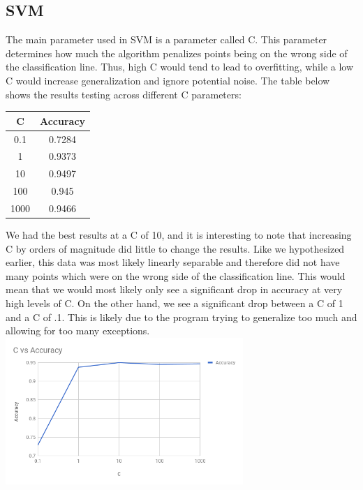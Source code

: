 \documentclass{article}
\begin{document}
        \subsection{SVM}
        The main parameter used in SVM is a parameter called C. This parameter determines how much 
        the algorithm penalizes points being on the wrong side of the classification line. Thus, 
        high C would tend to lead to overfitting, while a low C would increase generalization and 
        ignore potential noise. The table below shows the results testing across different C 
        parameters:
        \begin{center}
            \begin{tabular}{|c|c|}
                \hline
                C       & Accuracy\\
                \hline
                0.1     & 0.7284\\
                1       & 0.9373\\
                10      & 0.9497\\
                100     & 0.945\\
                1000    & 0.9466\\
                \hline
            \end{tabular}
        \end{center}
        We had the best results at a C of 10, and it is interesting to note that increasing C by 
        orders of magnitude did little to change the results. Like we hypothesized earlier, this 
        data was most likely linearly separable and therefore did not have many points which were 
        on the wrong side of the classification line. This would mean that we would most likely 
        only see a significant drop in accuracy at very high levels of C. On the other hand, we 
        see a significant drop between a C of 1 and a C of .1. This is likely due to the program 
        trying to generalize too much and allowing for too many exceptions.\\
        \includegraphics[width=9cm]{graphs/C_versus_accuracy}
\end{document}

